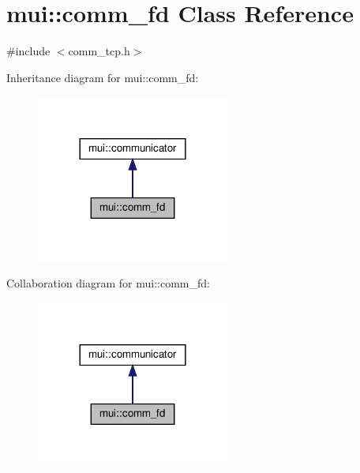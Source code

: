 \hypertarget{classmui_1_1comm__fd}{}\section{mui\+:\+:comm\+\_\+fd Class Reference}
\label{classmui_1_1comm__fd}


{\ttfamily \#include $<$comm\+\_\+tcp.\+h$>$}



Inheritance diagram for mui\+:\+:comm\+\_\+fd\+:
\nopagebreak
\begin{figure}[H]
\begin{center}
\leavevmode
\includegraphics[width=180pt]{classmui_1_1comm__fd__inherit__graph}
\end{center}
\end{figure}


Collaboration diagram for mui\+:\+:comm\+\_\+fd\+:
\nopagebreak
\begin{figure}[H]
\begin{center}
\leavevmode
\includegraphics[width=180pt]{classmui_1_1comm__fd__coll__graph}
\end{center}
\end{figure}
